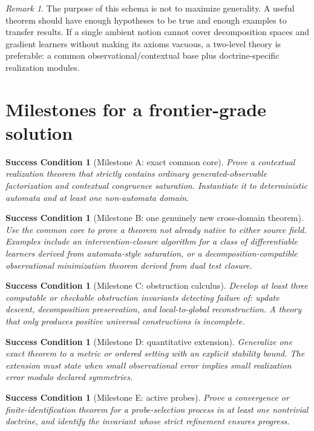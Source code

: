 \documentclass[11pt]{article}
\newtheorem{condition}[theorem]{Success Condition}
\theoremstyle{definition}
\theoremstyle{remark}
\newtheorem{remark}[theorem]{Remark}
\begin{document}
\begin{remark}
The purpose of this schema is not to maximize generality. A useful theorem should have enough hypotheses to be true and enough examples to transfer results. If a single ambient notion cannot cover decomposition spaces and gradient learners without making its axioms vacuous, a two-level theory is preferable: a common observational/contextual base plus doctrine-specific realization modules.
\end{remark}

\section{Milestones for a frontier-grade solution}

\begin{condition}[Milestone A: exact common core]
Prove a contextual realization theorem that strictly contains ordinary generated-observable factorization and contextual congruence saturation. Instantiate it to deterministic automata and at least one non-automata domain.
\end{condition}

\begin{condition}[Milestone B: one genuinely new cross-domain theorem]
Use the common core to prove a theorem not already native to either source field. Examples include an intervention-closure algorithm for a class of differentiable learners derived from automata-style saturation, or a decomposition-compatible observational minimization theorem derived from dual test closure.
\end{condition}

\begin{condition}[Milestone C: obstruction calculus]
Develop at least three computable or checkable obstruction invariants detecting failure of: update descent, decomposition preservation, and local-to-global reconstruction. A theory that only produces positive universal constructions is incomplete.
\end{condition}

\begin{condition}[Milestone D: quantitative extension]
Generalize one exact theorem to a metric or ordered setting with an explicit stability bound. The extension must state when small observational error implies small realization error modulo declared symmetries.
\end{condition}

\begin{condition}[Milestone E: active probes]
Prove a convergence or finite-identification theorem for a probe-selection process in at least one nontrivial doctrine, and identify the invariant whose strict refinement ensures progress.
\end{condition}
\end{document}
